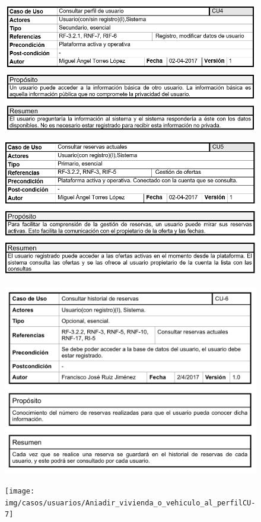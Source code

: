 	\begin{figure}[h!]
		\centering
		\includegraphics[width=0.95\linewidth]{img/casos/usuarios/Gestion_usuarios_consultar_perfil}
		\label{fig:gestionusuariosconsultarperfil}
	\end{figure}
\clearpage
	\begin{figure}[h!]
		\centering
		\includegraphics[width=0.9\linewidth]{img/casos/usuarios/Gestion_usuarios_consultar_reservas}
		\label{fig:gestionusuariosconsultarreservas}
	\end{figure}
			
	\begin{figure}[h!]
		\centering
		\includegraphics[width=0.9\linewidth]{img/casos/usuarios/Consulta_historial_reservasCU-6}
		\label{fig:consultahistorialreservascu-6}
	\end{figure}
\clearpage
	\begin{figure}[h!]
		\centering
		\texttt{[image: img/casos/usuarios/Aniadir\_vivienda\_o\_vehiculo\_al\_perfilCU-7]}
		\label{fig:anadirviviendaovehiculoalperfilcu-7}
	\end{figure}
	
